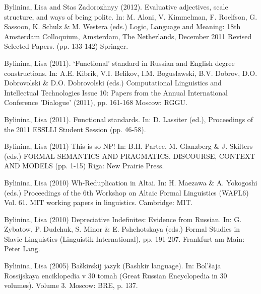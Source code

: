 \documentclass[12pt,letterpaper]{article}
\begin{document}
{\begin{hangparas}{.25in}{1}
\vspace{1mm}

Bylinina, Lisa and Stas Zadorozhnyy (2012). Evaluative adjectives, scale structure, and ways of being polite. In: M. Aloni, V. Kimmelman, F. Roelfson, G. Sassoon, K. Schulz \& M. Westera (eds.) Logic, Language and Meaning: 18th Amsterdam Colloquium, Amsterdam, The Netherlands, December 2011 Revised Selected Papers. (pp. 133-142) Springer. 

\vspace{1mm}

Bylinina, Lisa (2011). `Functional' standard in Russian and English degree constructions. In: A.E. Kibrik, V.I. Belikov, I.M. Boguslawski, B.V. Dobrov, D.O. Dobrovolski \& D.O. Dobrovolski (eds.) Computational Linguistics and Intellectual Technologies Issue 10: Papers from the Annual International Conference 'Dialogue' (2011), pp. 161-168 Moscow: RGGU.

\vspace{1mm}

Bylinina, Lisa (2011). Functional standards. In: D. Lassiter (ed.), Proceedings of the 2011 ESSLLI Student Session (pp. 46-58). 

\vspace{1mm}

Bylinina, Lisa (2011) This is so NP! In: B.H. Partee, M. Glanzberg \& J. Skilters (eds.) FORMAL SEMANTICS AND PRAGMATICS. DISCOURSE, CONTEXT AND MODELS (pp. 1-15) Riga: New Prairie Press.

\vspace{1mm}

Bylinina, Lisa (2010) Wh-Reduplication in Altai. In: H. Maezawa \& A. Yokogoshi (eds.) Proceedings of the 6th Workshop on Altaic Formal Linguistics (WAFL6) Vol. 61. MIT working papers in linguistics. Cambridge: MIT.

\vspace{1mm}

Bylinina, Lisa (2010) Depreciative Indefinites: Evidence from Russian. In: G. Zybatow, P. Dudchuk, S. Minor \& E. Pshehotskaya (eds.) Formal Studies in Slavic Linguistics (Linguistik International), pp. 191-207. Frankfurt am Main: Peter Lang.

\vspace{1mm}

Bylinina, Lisa (2005) Ba\v{s}kirskij jazyk (Bashkir language). In: Bol'\v{s}aja Rossijskaya enciklopedia v 30 tomah (Great Russian Encyclopedia in 30 volumes). Volume 3. Moscow: BRE, p. 137.


\end{hangparas}}
\end{document}
